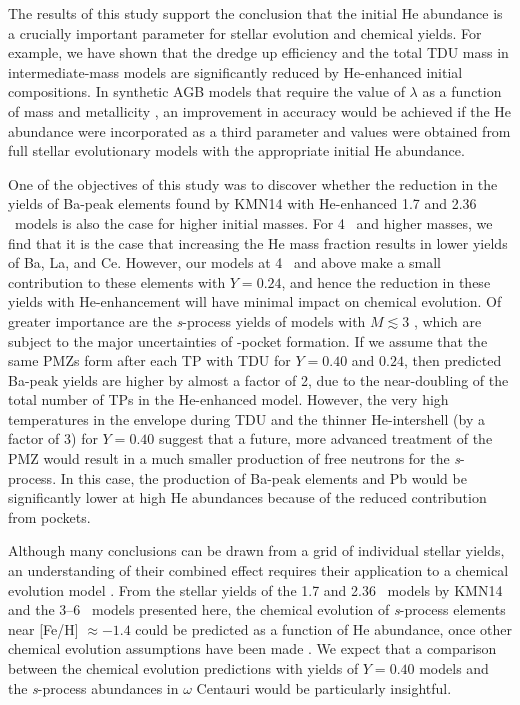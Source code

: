 The results of this study support the conclusion that the initial He abundance is a crucially important parameter for stellar evolution and chemical yields. For example, we have shown that the dredge up efficiency and the total TDU mass in intermediate-mass models are significantly reduced by He-enhanced initial compositions. In synthetic AGB models that require the value of $\lambda$ as a function of mass and metallicity \citep[e.g.,][]{Bertelli:2008ge,Buell:2013be}, an improvement in accuracy would be achieved if the He abundance were incorporated as a third parameter and values were obtained from full stellar evolutionary models with the appropriate initial He abundance.

One of the objectives of this study was to discover whether the reduction in the yields of Ba-peak elements found by KMN14 with He-enhanced 1.7 and 2.36 \Msun\ models is also the case for higher initial masses. For 4 \Msun\ and higher masses, we find that it is the case that increasing the He mass fraction results in lower yields of Ba, La, and Ce. However, our models at 4 \Msun\ and above make a small contribution to these elements with $Y=0.24$, and hence the reduction in these yields with He-enhancement will have minimal impact on chemical evolution. Of greater importance are the \textit{s}-process yields of models with $M \lesssim 3$ \Msun, which are subject to the major uncertainties of -pocket formation. If we assume that the same PMZs form after each TP with TDU for $Y=0.40$ and $0.24$, then predicted Ba-peak yields are higher by almost a factor of 2, due to the near-doubling of the total number of TPs in the He-enhanced model. However, the very high temperatures in the envelope during TDU and the thinner He-intershell (by a factor of 3) for $Y=0.40$ suggest that a future, more advanced treatment of the PMZ would result in a much smaller production of free neutrons for the \textit{s}-process. In this case, the production of Ba-peak elements and Pb would be significantly lower at high He abundances because of the reduced contribution from  pockets.

Although many conclusions can be drawn from a grid of individual stellar yields, an understanding of their combined effect requires their application to a chemical evolution model \citep[e.g.,][]{Travaglio:1999jf,Kobayashi:2011hj,Bisterzo:2014gk,Shingles:2014ja}. From the stellar yields of the 1.7 and 2.36 \Msun\ models by KMN14 and the 3--6 \Msun\ models presented here, the chemical evolution of \textit{s}-process elements near [Fe/H] $\approx -1.4$ could be predicted as a function of He abundance, once other chemical evolution assumptions have been made \citep[e.g.,][for light and $\alpha$ elements]{Romano:2007ks}. We expect that a comparison between the chemical evolution predictions with yields of $Y=0.40$ models and the \textit{s}-process abundances in $\omega$ Centauri would be particularly insightful.

